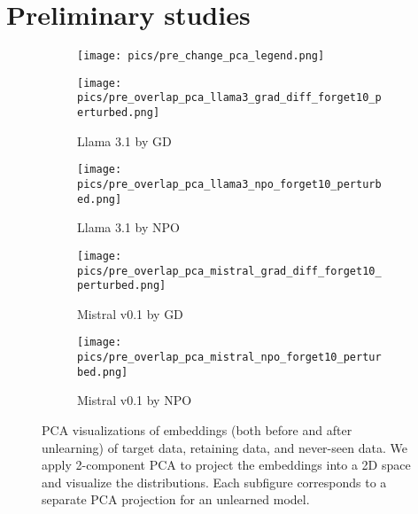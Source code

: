 \section{Preliminary studies}
\label{sec:prelim}




\begin{figure*}[t]
    \centering
    \begin{subfigure}[b]{0.87\textwidth}
        \centering
        \texttt{[image: pics/pre\_change\_pca\_legend.png]}
        \label{fig:pre_change_pca_legend}
    \end{subfigure}\hfill
    \begin{subfigure}[b]{0.249\textwidth}
        \centering
        \texttt{[image: pics/pre\_overlap\_pca\_llama3\_grad\_diff\_forget10\_perturbed.png]}
        \vspace{-0.37in}
        \caption{Llama 3.1 by GD}
        \label{fig:llama_gd}
    \end{subfigure}\hfill
    \begin{subfigure}[b]{0.249\textwidth}
        \centering
        \texttt{[image: pics/pre\_overlap\_pca\_llama3\_npo\_forget10\_perturbed.png]}
        \vspace{-0.37in}
        \caption{Llama 3.1 by NPO}
        \label{fig:llama_npo}
    \end{subfigure}\hfill
    \begin{subfigure}[b]{0.249\textwidth}
        \centering
        \texttt{[image: pics/pre\_overlap\_pca\_mistral\_grad\_diff\_forget10\_perturbed.png]}
        \vspace{-0.37in}
        \caption{Mistral v0.1 by GD}
        \label{fig:mistral_gd}
    \end{subfigure}\hfill
    \begin{subfigure}[b]{0.249\textwidth}
        \centering
        \texttt{[image: pics/pre\_overlap\_pca\_mistral\_npo\_forget10\_perturbed.png]}
        \vspace{-0.37in}
        \caption{Mistral v0.1 by NPO}
        \label{fig:mistral_npo}
    \end{subfigure}
    \caption{PCA visualizations of embeddings (both before and after unlearning) of target data, retaining data, and never-seen data. We apply 2-component PCA to project the embeddings into a 2D space and visualize the distributions. Each subfigure corresponds to a separate PCA projection for an unlearned model.}
    \label{fig:pre_overlap}
    \vspace{-0.13in}
\end{figure*}

